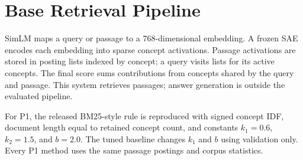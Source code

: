 \section{Base Retrieval Pipeline}
SimLM maps a query or passage to a 768-dimensional embedding. A frozen SAE
encodes each embedding into sparse concept activations. Passage activations
are stored in posting lists indexed by concept; a query visits lists for its
active concepts. The final score sums contributions from concepts shared by
the query and passage. This system retrieves passages; answer generation is
outside the evaluated pipeline.

For P1, the released BM25-style rule is reproduced with signed concept IDF,
document length equal to retained concept count, and constants
$k_1=0.6$, $k_2=1.5$, and $b=2.0$. The tuned baseline changes $k_1$ and $b$
using validation only. Every P1 method uses the same passage postings and
corpus statistics.
